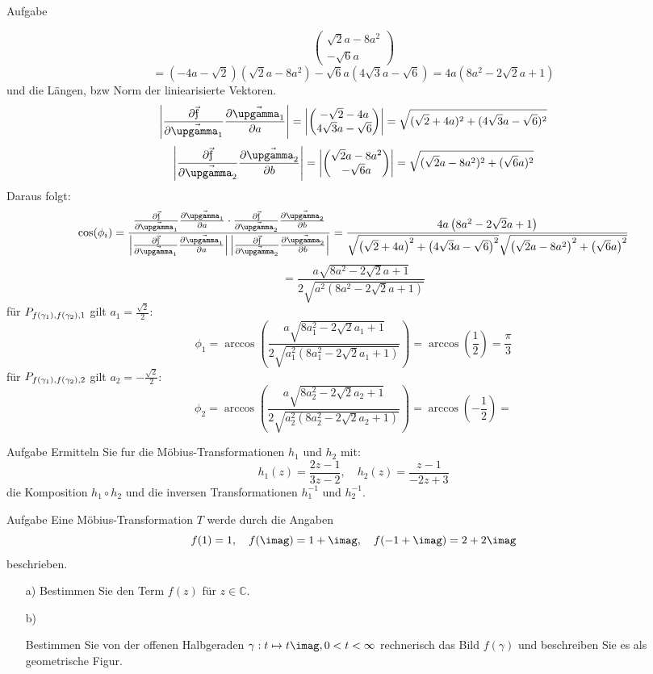 \documentclass{scrartcl}
\def\mbb#1{\mathbb{#1}}
\def\bC{\mbb{C}}
\begin{document}
\begin{section}{Aufgabe}
\begin{itemize}
\[\begin{pmatrix}
    \sqrt{2} a-8 a^2  \\
    -\sqrt{6} a
\end{pmatrix}\]
\[=\left(-4 a-\sqrt{2}\right) \left(\sqrt{2} a-8 a^2\right)-\sqrt{6} a \left(4 \sqrt{3} a-\sqrt{6}\right)
=4 a \left(8 a^2-2 \sqrt{2} a+1\right)\] und die Längen, bzw Norm der liniearisierte Vektoren. 
\[\left|\pfa\right|=\left|\begin{pmatrix}
    -\sqrt{2}-4a\\
    4\sqrt{3}a-\sqrt{6}
\end{pmatrix}\right|=\sqrt{(\sqrt{2}+4a)^2+(4\sqrt{3}a-\sqrt{6})^2}\] 
\[\left|\pfb\right|=\left|\begin{pmatrix}
    \sqrt{2} a-8 a^2  \\
    -\sqrt{6} a
\end{pmatrix}\right|=\sqrt{(\sqrt{2}a-8a^2)^2+(\sqrt{6} a)^2}\] 
Daraus folgt:
\[\cos(\phi_i)=\frac{\pfa\cdot\pfb}{\left|\pfa\right|\left|\pfb\right|}
=\frac{4 a \left(8 a^2-2 \sqrt{2} a+1\right)}{\sqrt{\left(\sqrt{2}+4a\right)^2+\left(4\sqrt{3}a-\sqrt{6}\right)^2}\sqrt{\left(\sqrt{2}a-8a^2\right)^2+\left(\sqrt{6} a\right)^2}}
\]\[=\frac{a \sqrt{8 a^2-2 \sqrt{2} a+1}}{2 \sqrt{a^2 \left(8 a^2-2 \sqrt{2} a+1\right)}}\]
für \(P_{f(\gamma_1),f(\gamma_2),1}\) gilt $a_1=\frac{\sqrt 2}{2}$:
\[\phi_1=\arccos(\frac{a \sqrt{8 a_1^2-2 \sqrt{2} a_1+1}}{2 \sqrt{a_1^2 \left(8 a_1^2-2 \sqrt{2} a_1+1\right)}})=\arccos(\frac{1}{2})=\frac{\pi}{3}\]
für \(P_{f(\gamma_1),f(\gamma_2),2}\) gilt $a_2=-\frac{\sqrt 2}{2}$:
\[\phi_2=\arccos(\frac{a \sqrt{8 a_2^2-2 \sqrt{2} a_2+1}}{2 \sqrt{a_2^2 \left(8 a_2^2-2 \sqrt{2} a_2+1\right)}})=\arccos(-\frac{1}{2})=\]
\end{itemize}


\end{section}
\begin{section}{Aufgabe}%
Ermitteln Sie fur die Möbius-Transformationen $h_1$ und $h_2$ mit:
\[h_1(z)=\frac{2z-1}{3z-2},\quad h_2(z)=\frac{z-1}{-2z+3}\]
die Komposition $h_1 \circ h_2$ und die inversen Transformationen $h_1^{-1}$ und $h_2^{-1}$.

\end{section}
\begin{section}{Aufgabe}%
Eine Möbius-Transformation $T$ werde durch die Angaben
\[f(1)=1,\quad f(\imag)=1+\imag,\quad f(-1+\imag)=2+2\imag\]
beschrieben.
\begin{itemize}
\item[a)]
Bestimmen Sie den Term $f(z)$ für $z \in \bC$.
\item[b)]

Bestimmen Sie von der offenen Halbgeraden $\gamma : t \mapsto t \imag, 0 < t < \infty$ rechnerisch
das Bild $f(\gamma)$ und beschreiben Sie es als geometrische Figur.
\end{itemize}
\end{section}
\end{document}
